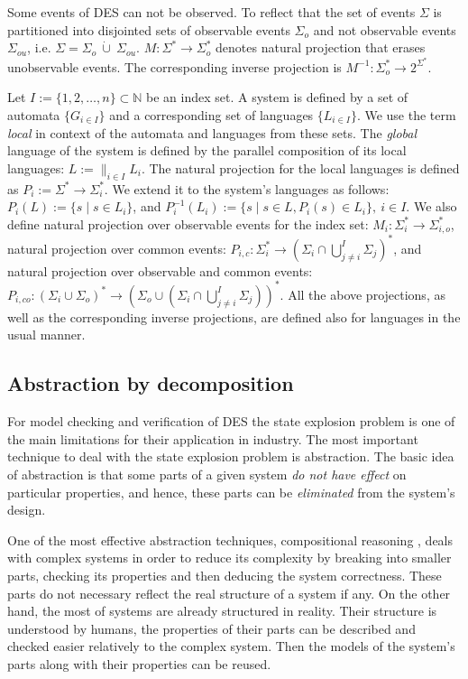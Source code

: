Some events of DES can not be observed. To reflect that the set of events
$\Sigma$ is partitioned into disjointed sets of observable events $\Sigma_o$ and
not observable events $\Sigma_{ou}$, i.e. $\Sigma = \Sigma_o~\dot{\cup}~
\Sigma_{ou}$.
$M: \Sigma^* \rightarrow \Sigma_o^*$ denotes natural projection that
erases unobservable events.
The corresponding inverse projection is $M^{-1}: \Sigma_o^* \rightarrow
2^{\Sigma^*}$.

Let $I := \{1,2,\ldots,n\} \subset  \mathbb{N}$ be an index set. A system is
defined by a set of automata $\{G_{i \in I}\}$ and a corresponding set of
languages $\{L_{i \in I}\}$. We use the term \emph{local} in context of the
automata and languages from these sets. The \emph{global} language of the system
is defined by the parallel composition \cite{cassandras_introduction_2010} of
its local languages:
$L := \parallel_{i \in I} L_i$.
The natural projection for the local languages is defined as 
$P_i := \Sigma^* \rightarrow \Sigma_i^*$. We extend it to the system's languages
as follows: $P_i(L) := \{s\mid s\in L_{i}\}$, and 
$P_i^{-1}(L_{i}) := \{s \mid s \in L, P_i(s) \in L_i\}, ~i \in I$.
We also define natural projection over observable events for the index set: 
$M_i :\Sigma_i^* \rightarrow \Sigma_{i,o}^*$, natural projection over common
events:
$P_{i,c} : \Sigma_i^* \rightarrow (\Sigma_i \cap \bigcup_{j\neq
i}^I\Sigma_j)^*$, and natural projection over observable and common events:
$P_{i,co} : (\Sigma_i \cup \Sigma_o)^* \rightarrow (\Sigma_{o} \cup (\Sigma_i
\cap \bigcup_{j\neq i}^I\Sigma_j))^*$. All the above projections, as well as
the corresponding inverse projections, are defined also for languages in the
usual manner.


\subsection{Abstraction by decomposition}

For model checking and verification of DES the state explosion problem is one of
the main limitations for their application in industry. The most important
technique to deal with the state explosion problem is abstraction. The basic
idea of abstraction is that some parts of a given system \emph{do not have
effect} on particular properties, and hence, these parts can be
\emph{eliminated} from the system's design.

One of the most effective abstraction techniques, compositional reasoning
\cite{berezin_compositional_1998}, deals with complex systems in order to reduce
its complexity by breaking into smaller parts, checking its properties and then
deducing the system correctness. These parts do not necessary reflect the real
structure of a system if any. On the other hand, the most of systems are
already structured in reality. Their structure is understood by humans, the
properties of their parts can be described and checked easier relatively to the
complex system. Then the models of the system's parts along with their
properties can be reused.

